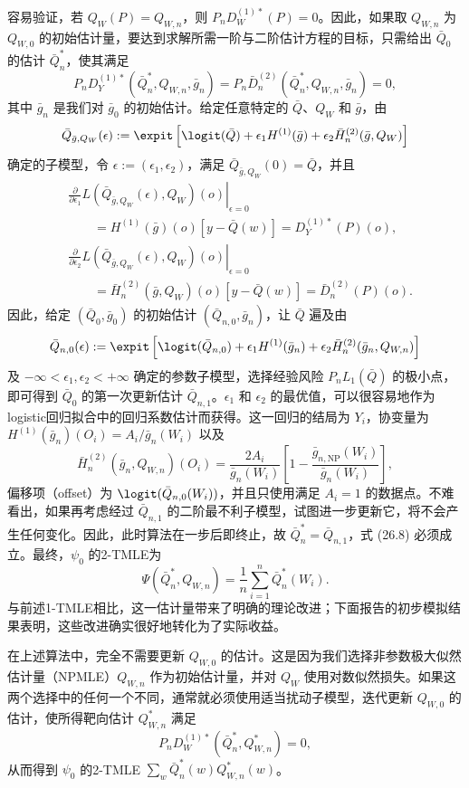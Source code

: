 容易验证，若 $Q_W(P)=Q_{W,n}$，则 $P_nD_W^{(1)*}(P)=0$。因此，如果取 $Q_{W,n}$ 为 $Q_{W,0}$ 的初始估计量，要达到求解所需一阶与二阶估计方程的目标，只需给出 $\bar Q_0$ 的估计 $\bar Q_n^*$，使其满足
\begin{equation}
P_nD_Y^{(1)*}(\bar Q_n^*,Q_{W,n},\bar g_n)
=P_n\bar D_n^{(2)}(\bar Q_n^*,Q_{W,n},\bar g_n)=0,
\tag{26.8}
\end{equation}
其中 $\bar g_n$ 是我们对 $\bar g_0$ 的初始估计。给定任意特定的 $\bar Q$、$Q_W$ 和 $\bar g$，由
\[
\bar Q_{\bar g,Q_W}(\epsilon):=\expit\left[\logit(\bar Q)
+\epsilon_1H^{(1)}(\bar g)+\epsilon_2\bar H_n^{(2)}(\bar g,Q_W)\right]
\]
确定的子模型，令 $\epsilon:=(\epsilon_1,\epsilon_2)$，满足 $\bar Q_{\bar g,Q_W}(0)=\bar Q$，并且
\[
\begin{aligned}
&\left.\frac{\partial}{\partial\epsilon_1}
L(\bar Q_{\bar g,Q_W}(\epsilon),Q_W)(o)\right|_{\epsilon=0}\\
&\qquad=H^{(1)}(\bar g)(o)[y-\bar Q(w)]=D_Y^{(1)*}(P)(o),\\
&\left.\frac{\partial}{\partial\epsilon_2}
L(\bar Q_{\bar g,Q_W}(\epsilon),Q_W)(o)\right|_{\epsilon=0}\\
&\qquad=\bar H_n^{(2)}(\bar g,Q_W)(o)[y-\bar Q(w)]=\bar D_n^{(2)}(P)(o).
\end{aligned}
\]
因此，给定 $(\bar Q_0,\bar g_0)$ 的初始估计 $(\bar Q_{n,0},\bar g_n)$，让 $\bar Q$ 遍及由
\[
\bar Q_{n,0}(\epsilon):=\expit\left[\logit(\bar Q_{n,0})
+\epsilon_1H^{(1)}(\bar g_n)+\epsilon_2\bar H_n^{(2)}(\bar g_n,Q_{W,n})\right]
\]
及 $-\infty<\epsilon_1,\epsilon_2<+\infty$ 确定的参数子模型，选择经验风险 $P_nL_1(\bar Q)$ 的极小点，即可得到 $\bar Q_0$ 的第一次更新估计 $\bar Q_{n,1}$。$\epsilon_1$ 和 $\epsilon_2$ 的最优值，可以很容易地作为logistic回归拟合中的回归系数估计而获得。这一回归的结局为 $Y_i$，协变量为 $H^{(1)}(\bar g_n)(O_i)=A_i/\bar g_n(W_i)$ 以及
\[
\bar H_n^{(2)}(\bar g_n,Q_{W,n})(O_i)=\frac{2A_i}{\bar g_n(W_i)}
\left[1-\frac{\bar g_{n,\mathrm{NP}}(W_i)}{\bar g_n(W_i)}\right],
\]
偏移项（offset）为 $\logit(\bar Q_{n,0}(W_i))$，并且只使用满足 $A_i=1$ 的数据点。不难看出，如果再考虑经过 $\bar Q_{n,1}$ 的二阶最不利子模型，试图进一步更新它，将不会产生任何变化。因此，此时算法在一步后即终止，故 $\bar Q_n^*=\bar Q_{n,1}$，式 (26.8) 必须成立。最终，$\psi_0$ 的2-TMLE为
\[
\Psi(\bar Q_n^*,Q_{W,n})=\frac1n\sum_{i=1}^n\bar Q_n^*(W_i).
\]
与前述1-TMLE相比，这一估计量带来了明确的理论改进；下面报告的初步模拟结果表明，这些改进确实很好地转化为了实际收益。

在上述算法中，完全不需要更新 $Q_{W,0}$ 的估计。这是因为我们选择非参数极大似然估计量（NPMLE）$Q_{W,n}$ 作为初始估计量，并对 $Q_W$ 使用对数似然损失。如果这两个选择中的任何一个不同，通常就必须使用适当扰动子模型，迭代更新 $Q_{W,0}$ 的估计，使所得靶向估计 $Q_{W,n}^*$ 满足
\[
P_nD_W^{(1)*}(\bar Q_n^*,Q_{W,n}^*)=0,
\]
从而得到 $\psi_0$ 的2-TMLE $\sum_w\bar Q_n^*(w)Q_{W,n}^*(w)$。
